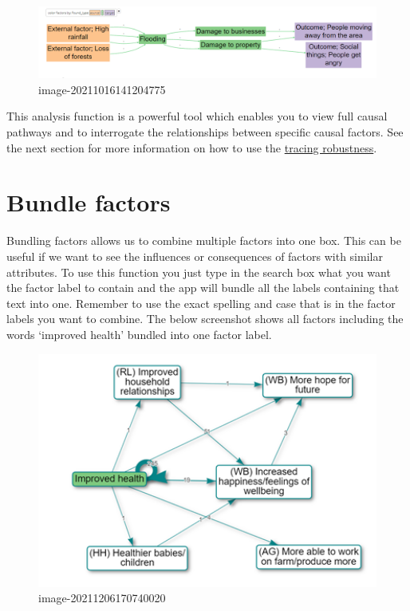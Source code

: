 \documentclass[
]{book}
\begin{document}
\begin{figure}
\centering
\includegraphics{_assets/image-20211016141204775.png}
\caption{image-20211016141204775}
\end{figure}

This analysis function is a powerful tool which enables you to view full causal pathways and to interrogate the relationships between specific causal factors. See the next section for more information on how to use the \protect\hyperlink{xrobustness}{tracing robustness}.

\hypertarget{bundlefactors}{%
\section{Bundle factors}\label{bundlefactors}}

Bundling factors allows us to combine multiple factors into one box. This can be useful if we want to see the influences or consequences of factors with similar attributes. To use this function you just type in the search box what you want the factor label to contain and the app will bundle all the labels containing that text into one. Remember to use the exact spelling and case that is in the factor labels you want to combine. The below screenshot shows all factors including the words `improved health' bundled into one factor label.

\begin{figure}
\centering
\includegraphics[width=6.77083in,height=\textheight]{_assets/image-20211206170740020.png}
\caption{image-20211206170740020}
\end{figure}
\end{document}
